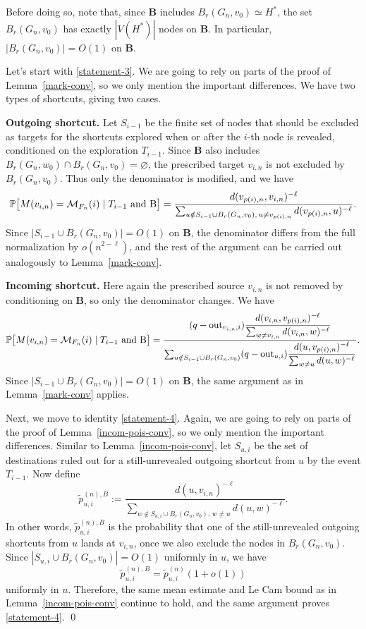 \documentclass[10pt]{amsart}
\begin{document}
Before doing so, note that, since \textbf{B} includes \(B_r(G_n,v_0)\simeq H^*\), the set \(B_r(G_n,v_0)\) has exactly \(|V(H^*)|\) nodes on \textbf{B}. In particular, \(|B_r(G_n,v_0)|=O(1)\) on \textbf{B}.

Let's start with \eqref{statement-3}. We are going to rely on parts of the proof of Lemma~\ref{mark-conv}, so we only mention the important differences. We have two types of shortcuts, giving two cases.

\noindent\textbf{Outgoing shortcut.}
Let $S_{i-1}$ be the finite set of nodes that should be excluded as targets for the shortcuts explored when or after the $i$-th node is revealed, conditioned on the exploration $T_{i-1}$. Since \textbf{B} also includes \(B_r(G_n,w_0)\cap B_r(G_n,v_0)=\varnothing\), the prescribed target \(v_{i,n}\) is not excluded by \(B_r(G_n,v_0)\). Thus only the denominator is modified, and we have
\[
\mathbb P\big[M(v_{i,n})=\mathcal M_{F_n}(i)\mid T_{i-1} \text{ and \textbf{B}}\big]
=
\frac{d(v_{p(i),n},v_{i,n})^{-\ell}}
{\sum_{u\notin S_{i-1}\cup B_r(G_n, v_0),\,u\neq v_{p(i),n}} d(v_{p(i),n},u)^{-\ell}}.
\]
Since \(|S_{i-1}\cup B_r(G_n,v_0)|=O(1)\) on \textbf{B}, the denominator differs from the full normalization by \(o(n^{2-\ell})\), and the rest of the argument can be carried out analogously to Lemma~\ref{mark-conv}.

\noindent\textbf{Incoming shortcut.} 
Here again the prescribed source \(v_{i,n}\) is not removed by conditioning on \textbf{B}, so only the denominator changes. We have
\[
\mathbb P\big[M(v_{i,n})=\mathcal M_{F_n}(i)\mid T_{i-1} \text{ and \textbf{B}}\big]
=
\frac{
(q-\mathrm{out}_{v_{i,n},i})
\dfrac{d(v_{i,n},v_{p(i),n})^{-\ell}}
{\sum_{w\neq v_{i,n}} d(v_{i,n},w)^{-\ell}}
}
{
\sum_{u \notin S_{i-1} \cup B_r(G_n, v_0)}
(q-\mathrm{out}_{u,i})
\dfrac{d(u,v_{p(i),n})^{-\ell}}
{\sum_{w\neq u} d(u,w)^{-\ell}}
}.
\]
Since \(|S_{i-1}\cup B_r(G_n,v_0)|=O(1)\) on \textbf{B}, the same argument as in Lemma~\ref{mark-conv} applies.

Next, we move to identity \eqref{statement-4}. Again, we are going to rely on parts of the proof of Lemma~\ref{incom-pois-conv}, so we only mention the important differences. Similar to Lemma~\ref{incom-pois-conv}, let \(S_{u,i}\) be the set of destinations ruled out for a still-unrevealed outgoing shortcut from \(u\) by the event \(T_{i-1}\). Now define
\[
\tilde p_{u,i}^{(n),B}:=\frac{d(u,v_{i,n})^{-\ell}}{\sum_{w\notin S_{u,i}\cup B_r(G_n, v_0),\,w\neq u} d(u,w)^{-\ell}}.
\]
In other words, \(\tilde p_{u,i}^{(n),B}\) is the probability that one of the still-unrevealed outgoing shortcuts from \(u\) lands at \(v_{i,n}\), once we also exclude the nodes in \(B_r(G_n,v_0)\). Since \(|S_{u,i}\cup B_r(G_n,v_0)|=O(1)\) uniformly in \(u\), we have
\[
\tilde p_{u,i}^{(n),B}=\tilde p_{u,i}^{(n)}(1+o(1))
\]
uniformly in \(u\). Therefore, the same mean estimate and Le Cam bound as in Lemma~\ref{incom-pois-conv} continue to hold, and the same argument proves \eqref{statement-4}.
\qed
\end{document}
